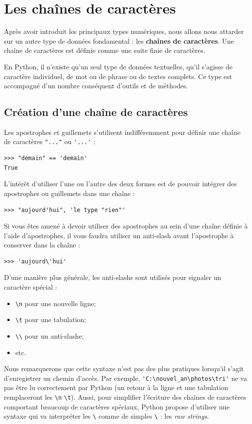 \documentclass[12pt, a4paper]{article}
\begin{document}
\section{Les chaînes de caractères}
Après avoir introduit les principaux types numériques, nous allons nous attarder sur un autre type de données fondamental : les \textbf{chaînes de caractères}. Une chaîne de caractères est définie comme une suite finie de caractères.

En Python, il n'existe qu'un seul type de données textuelles, qu'il s'agisse de caractère individuel, de mot ou de phrase ou de textes complets. Ce type est accompagné d'un nombre conséquent d'outils et de méthodes.

\subsection{Création d'une chaîne de caractères}
Les apostrophes et guillemets s'utilisent indifféremment pour définir une chaîne de caractères \lstinline{"..."} ou \lstinline{'...'} :
\begin{lstlisting}
>>> "demain" == 'demain'
True
\end{lstlisting}

L'intérêt d'utiliser l'une ou l'autre des deux formes est de pouvoir intégrer des apostrophes ou guillemets dans une chaîne :
\begin{lstlisting}
>>> "aujourd'hui", 'le type "rien"'
\end{lstlisting}

Si vous êtes amené à devoir utiliser des apostrophes au sein d'une chaîne définie à l'aide d'apostrophes, il vous faudra utiliser un anti-slash avant l'apostrophe à conserver dans la chaîne :
\begin{lstlisting}
>>> 'aujourd\'hui'
\end{lstlisting}

D'une manière plus générale, les anti-slashs sont utilisés pour signaler un caractère spécial :
\begin{itemize}
	\item \lstinline{\n} pour une nouvelle ligne;
	\item \lstinline{\t} pour une tabulation;
	\item \lstinline{\\} pour un anti-slashe;
	\item etc.
\end{itemize}

Nous remarquerons que cette syntaxe n'est pas des plus pratiques lorsqu'il s'agit d'enregistrer un chemin d'accès. Par exemple, \lstinline{'C:\nouvel_an\photos\tri'} ne va pas être lu correctement par Python (un retour à la ligne et une tabulation remplaceront les \lstinline{\n} \lstinline{\t}). Aussi, pour simplifier l'écriture des chaînes de caractères comportant beaucoup de caractères spéciaux, Python propose d'utiliser une syntaxe qui va interpréter les \lstinline{\} comme de simples \lstinline{\} : les \textit{raw strings}.
\end{document}
